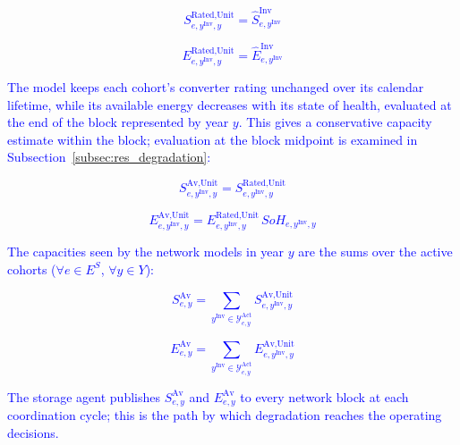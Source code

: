 \documentclass[preprint,12pt]{elsarticle}
\begin{document}
\textcolor{blue}{
    \begin{equation}
        S^{\text{Rated,Unit}}_{e,y^\text{Inv},y} = \hat{S}^{\text{Inv}}_{e,y^\text{Inv}}
        \label{eq:cohort_rated}
    \end{equation}
}

\textcolor{blue}{
    \begin{equation}
        E^{\text{Rated,Unit}}_{e,y^\text{Inv},y} = \hat{E}^{\text{Inv}}_{e,y^\text{Inv}}
        \label{eq:cohort_rated_energy}
    \end{equation}
}

\textcolor{blue}{
    The model keeps each cohort's converter rating unchanged over its calendar lifetime, while its available energy decreases with its state of health, evaluated at the end of the block represented by year $y$. This gives a conservative capacity estimate within the block; evaluation at the block midpoint is examined in Subsection~\ref{subsec:res_degradation}:
}

\textcolor{blue}{
    \begin{equation}
        S^{\text{Av,Unit}}_{e,y^\text{Inv},y} = S^{\text{Rated,Unit}}_{e,y^\text{Inv},y}
        \label{eq:cohort_available}
    \end{equation}
}

\textcolor{blue}{
    \begin{equation}
        E^{\text{Av,Unit}}_{e,y^\text{Inv},y} = E^{\text{Rated,Unit}}_{e,y^\text{Inv},y}\, SoH_{e,y^\text{Inv},y}
        \label{eq:cohort_available_energy}
    \end{equation}
}

\textcolor{blue}{
    The capacities seen by the network models in year $y$ are the sums over the active cohorts ($\forall e \in E^S$, $\forall y \in Y$):
}

\textcolor{blue}{
    \begin{equation}
        S^{\text{Av}}_{e,y} = \sum_{y^{\text{Inv}}\in\mathcal{Y}^{\text{Act}}_{e,y}} S^{\text{Av,Unit}}_{e,y^{\text{Inv}},y}
        \label{eq:available_power}
    \end{equation}
}

\textcolor{blue}{
    \begin{equation}
        E^{\text{Av}}_{e,y} = \sum_{y^{\text{Inv}}\in\mathcal{Y}^{\text{Act}}_{e,y}} E^{\text{Av,Unit}}_{e,y^{\text{Inv}},y}
        \label{eq:available_capacity}
    \end{equation}
}

\textcolor{blue}{
    The storage agent publishes $S^{\text{Av}}_{e,y}$ and $E^{\text{Av}}_{e,y}$ to every network block at each
    coordination cycle; this is the path by which degradation reaches the operating decisions.
}
\end{document}

